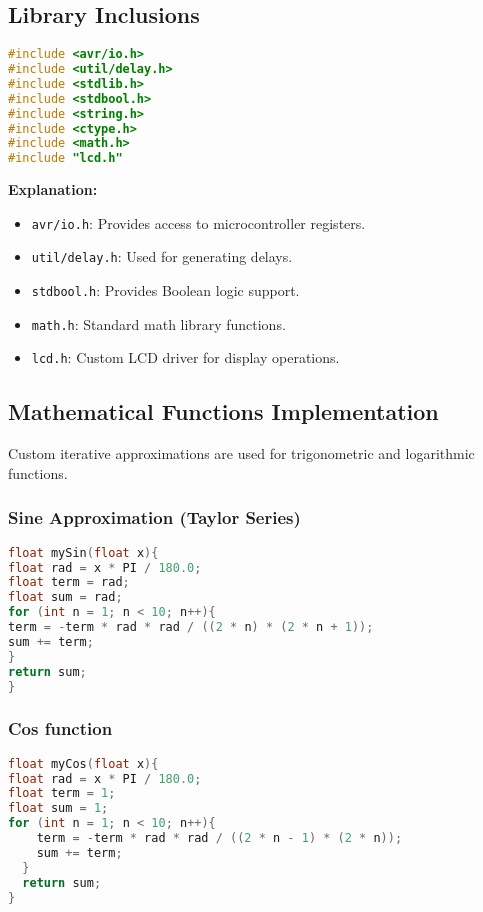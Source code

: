 
\subsection{Library Inclusions}
\begin{lstlisting}[language=C]
#include <avr/io.h>
#include <util/delay.h>
#include <stdlib.h>
#include <stdbool.h>
#include <string.h>
#include <ctype.h>
#include <math.h>
#include "lcd.h"
\end{lstlisting}
\textbf{Explanation:}
\begin{itemize}
\item \texttt{avr/io.h}: Provides access to microcontroller registers.
\item \texttt{util/delay.h}: Used for generating delays.
\item \texttt{stdbool.h}: Provides Boolean logic support.
\item \texttt{math.h}: Standard math library functions.
\item \texttt{lcd.h}: Custom LCD driver for display operations.
\end{itemize}

\subsection{Mathematical Functions Implementation}
Custom iterative approximations are used for trigonometric and logarithmic functions.

\subsubsection{Sine Approximation (Taylor Series)}
\begin{lstlisting}[language=C]
float mySin(float x){
float rad = x * PI / 180.0;
float term = rad;
float sum = rad;
for (int n = 1; n < 10; n++){
term = -term * rad * rad / ((2 * n) * (2 * n + 1));
sum += term;
}
return sum;
}
\end{lstlisting}
\subsubsection{Cos function}
\begin{lstlisting}[language=C]
float myCos(float x){
float rad = x * PI / 180.0;
float term = 1;
float sum = 1;
for (int n = 1; n < 10; n++){
    term = -term * rad * rad / ((2 * n - 1) * (2 * n));
    sum += term;
  }
  return sum;
}
\end{lstlisting}
